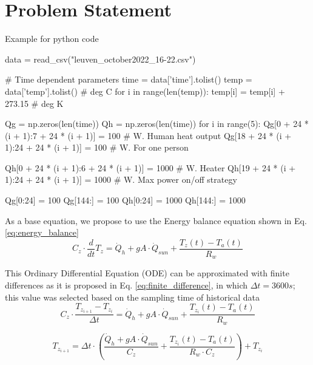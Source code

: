 \section{Problem Statement}
\label{sec:problem_statement}

Example for python code

\begin{python}
data = read_csv("leuven_october2022_16-22.csv")

# Time dependent parameters
time = data['time'].tolist()
temp = data['temp'].tolist()  # deg C
for i in range(len(temp)):
temp[i] = temp[i] + 273.15  # deg K

Qg = np.zeros(len(time))
Qh = np.zeros(len(time))
for i in range(5):
	Qg[0 + 24 * (i + 1):7 + 24 * (i + 1)] = 100  # W. Human heat output
	Qg[18 + 24 * (i + 1):24 + 24 * (i + 1)] = 100  # W. For one person

	Qh[0 + 24 * (i + 1):6 + 24 * (i + 1)] = 1000  # W. Heater
	Qh[19 + 24 * (i + 1):24 + 24 * (i + 1)] = 1000  # W. Max power on/off strategy

Qg[0:24] = 100
Qg[144:] = 100
Qh[0:24] = 1000
Qh[144:] = 1000
\end{python}


As a base equation, we propose to use the Energy balance equation shown in Eq. \ref{eq:energy_balance}
\begin{equation}
C_z \cdot \frac{d}{dt} T_z = \dot{Q}_h + gA \cdot \dot{Q}_{sun} + \frac{T_z(t)-T_a(t)}{R_w}
\label{eq:energy_balance}
\end{equation}

This Ordinary Differential Equation (ODE) can be approximated with finite differences as it is proposed in Eq. \ref{eq:finite_difference}, in which $\Delta t = 3600s$; this value was selected based on the sampling time of historical data
\begin{equation}
C_z \cdot \frac{T_{z_{i+1}}-T_{z_{i}}}{\Delta t} = \dot{Q}_h + gA \cdot \dot{Q}_{sun} + \frac{T_{z_{i}}(t)-T_a(t)}{R_w}
\label{eq:finite_difference}
\end{equation}

\begin{equation}
T_{z_{i+1}} = \Delta t \cdot \left( \frac{\dot{Q}_h + gA \cdot \dot{Q}_{sun}}{C_z} + \frac{T_{z_{i}}(t)-T_a(t)}{R_w \cdot C_z} \right) + T_{z_{i}}
\label{eq:finite_difference2}
\end{equation}